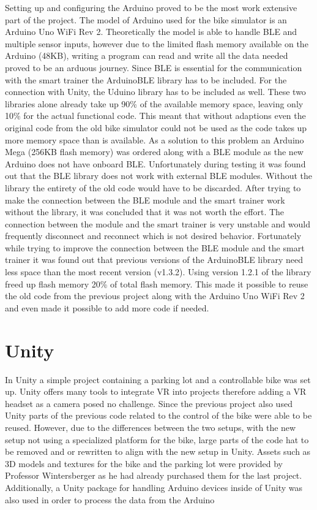 \documentclass[english,notitlepage,smartquotes]{hgbreport}
\begin{document}
Setting up and configuring the Arduino proved to be the most work extensive part of the project. The model of Arduino used for the bike simulator is an Arduino Uno WiFi Rev 2. Theoretically the model is able to handle BLE and multiple sensor inputs, however due to the limited flash memory available on the Arduino (48KB), writing a program can read and write all the data needed proved to be an arduous journey. 
Since BLE is essential for the communication with the smart trainer the ArduinoBLE library has to be included. For the connection with Unity, the Uduino library has to be included as well. These two libraries alone already take up 90\% of the available memory space, leaving only 10\% for the actual functional code. This meant that without adaptions even the original code from the old bike simulator could not be used as the code takes up more memory space than is available. 
As a solution to this problem an Arduino Mega (256KB flash memory) was ordered along with a BLE module as the new Arduino does not have onboard BLE. Unfortunately during testing it was found out that the BLE library does not work with external BLE modules. Without the library the entirety of the old code would have to be discarded. After trying to make the connection between the BLE module and the smart trainer work without the library, it was concluded that it was not worth the effort. The connection between the module and the smart trainer is very unstable and would frequently disconnect and reconnect which is not desired behavior.
Fortunately while trying to improve the connection between the BLE module and the smart trainer it was found out that previous versions of the ArduinoBLE library need less space than the most recent version (v1.3.2). Using version 1.2.1 of the library freed up flash memory 20\% of total flash memory. This made it possible to reuse the old code from the previous project along with the Arduino Uno WiFi Rev 2 and even made it possible to add more code if needed. 

\section{Unity}
In Unity a simple project containing a parking lot and a controllable bike was set up. 
Unity offers many tools to integrate VR into projects therefore adding a VR headset as a camera posed no challenge.
Since the previous project also used Unity parts of the previous code related to the control of the bike were able to be reused. 
However, due to the differences between the two setups, with the new setup not using a specialized platform for the bike, large parts of the code hat to be removed and or rewritten to align with the new setup in Unity. 
Assets such as 3D models and textures for the bike and the parking lot were provided by Professor Wintersberger as he had already purchased them for the last project.
Additionally, a Unity package for handling Arduino devices inside of Unity was also used in order to process the data from the Arduino
\end{document}
